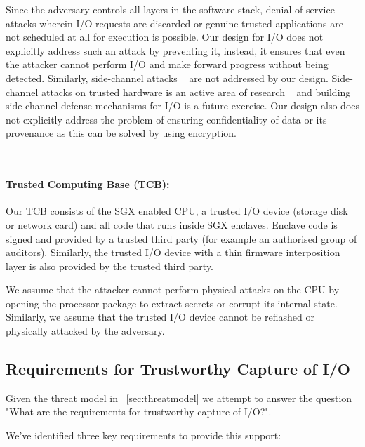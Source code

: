 \documentclass[withindex,glossary]{cam-thesis}
\begin{document}
Since the adversary controls all layers in the software stack, denial-of-service attacks wherein I/O requests are discarded or genuine trusted applications are not scheduled at all for execution is possible.
Our design for I/O does not explicitly address such an attack by preventing it, instead, it ensures that even the attacker cannot perform I/O and make forward progress without being detected.
Similarly, side-channel attacks ~\cite{sideat1, sideat2} are not addressed by our design.
Side-channel attacks on trusted hardware is an active area of research ~\cite{sidemiti1, sidemiti2} and building side-channel defense mechanisms for I/O is a future exercise.
Our design also does not explicitly address the problem of ensuring confidentiality of data or its provenance as this can be solved by using encryption.

~\paragraph{Trusted Computing Base (TCB):}
Our TCB consists of the SGX enabled CPU, a trusted I/O device (storage disk or network card) and all code that runs inside SGX enclaves.
Enclave code is signed and provided by a trusted third party (for example an authorised group of auditors).
Similarly, the trusted I/O device with a thin firmware interposition layer is also provided by the trusted third party.

We assume that the attacker cannot perform physical attacks on the CPU by opening the processor package to extract secrets or corrupt its internal state.
Similarly, we assume that the trusted I/O device cannot be reflashed or physically attacked by the adversary.

\subsection{Requirements for Trustworthy Capture of I/O}

Given the threat model in ~\ref{sec:threatmodel} we attempt to answer the question "What are the requirements for trustworthy capture of I/O?".

We've identified three key requirements to provide this support:
\end{document}
